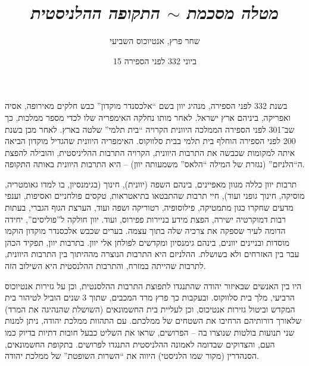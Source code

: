 \documentclass[]{article}
\author{שחר פרץ, אנטיוכוס השביעי}
\title{\textit{מטלה מסכמת $\sim$ התקופה ההלניסטית}}
\date{15 ביוני 332 לפני הספירה}
\begin{document}
    \maketitle
    
    \section{}
    בשנת 332 לפני הספירה, מנהיג יוון בשם ``אלכסנדר מוקדון'' כבש חלקים מאירופה, אסיה ואפריקה, ביניהם ארץ ישראל. לאחר מותו נחלקה האימפריה שלו לכדי מספר ממלכות, כך שב־301 לפני הספירה הממלכה היוונית הקרויה ``בית תלמי'' שלטה בארץ. לאחר מכן בשנת 200 לפני הספירה הוחלף בית תלמי בבית סלווקוס. האימפריה היוונית שהגדיל מוקדון הביאה איתה למקומות שכבשה את התרבות היוונית, הקרויה התרבות ההליניסטית, והובילה להפצת ה``הלניזם'' (נגזרת של המילה ``הלאס'' משמעותה יוון) – היא התרבות היוונית באותה התקופה. 
    
    תרבות יוון כללה מגוון מאפיינים, בינהם השפה (יוונית), חינוך (בגימנסיון, בו למדו גאומטריה, מוסיקה, חינוך גופני ועוד), חיי תרבות שהתבטאו בתיאטראות, טקסים פולחניים ואסיפות, וענפי מדעים שחקרו כגון מתמטיקה, פילוסופיה, רטוריקה ושפה ועוד, הערצת הגוף הגברי, בעתות רבות דמוקרטיה ישירה, הפצת מידע בניירות פפירוס, ועוד. יוון חולקה ל''פוליסים'', יחידה הדומה לעיר שספקה את צרכיה שלה בתוך עצמה. בערים שכבש אלכסנדר מוקדון הוקמו מוסדות ובניינים יוונים, בינהם גימנסיון ומקדשים לפולחן אלי יוון. בתרבות יוון, תפקיד הכהן עבר בין האזרחים ולא בשושלת. ההלניזם היא התרבות הנוצרה מההיתוך בין התרבות היוונית, לתרבות שהייתה במזרח, והתרבות ההלנסטית היא השילוב הזה. 
    
    היו בין האנשים שבאיזור יהודה שהתנגדו לתפוצת התרבות ההלסנטית, וכן על גזירות אנטיוכוס הרביעי, מלך בית סלווקוס. ובעקבות כך פרץ מרד המכבים, שתוך 3 שנים הוביל לטיהור בית המקדש וביטול גזירות אנטיכוס, וכן לעליית בית החשמונאים (השושלת שהנהיגה את המרד) שלאורך דורותיהם הרחיבו את השטחים של ממלכתם. עם התהוות ממלכת יהודה, ניתן למנות שני תנועות בולטות שנוצרו בה – הפרושים, שראו את השליט כבעל חובות דתיות בדיוק כמו העם, והצדוקים שבדומה לאמונה ההלניסטית התנגדו לפרושים. בתקופת החשמונאים, הסנהדרין (מקור שמו הלניסטי) היווה את ``השרות השופטת'' של ממלכת יהודה. 
    
\end{document}
